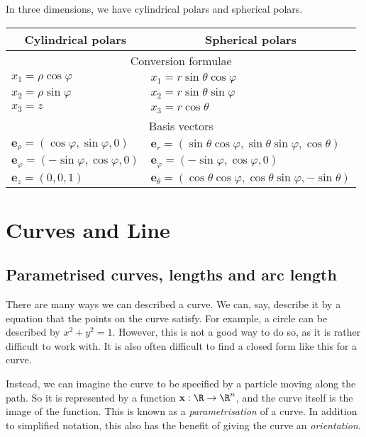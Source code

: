 \documentclass[a4paper]{article}
\begin{document}
In three dimensions, we have cylindrical polars and spherical polars.
\begin{center}
  \begin{tabularx}{\textwidth}{XX}
    \toprule
    \multicolumn{1}{c}{Cylindrical polars} & \multicolumn{1}{c}{Spherical polars}\\
    \midrule
    \multicolumn{2}{c}{Conversion formulae}\\
    \midrule
    $x_1 = \rho \cos \varphi$ & $x_1 = r\sin \theta\cos \varphi$\\
    $x_2 = \rho \sin \varphi$ & $x_2 = r\sin \theta \sin \varphi$\\
    $x_3 = z$ & $x_3 = r\cos\theta$\\
    \midrule
    \multicolumn{2}{c}{Basis vectors}\\
    \midrule
    $\mathbf{e}_\rho = (\cos\varphi, \sin \varphi, 0)$ & $\mathbf{e}_r = (\sin\theta\cos\varphi, \sin \theta\sin \varphi , \cos \theta)$\\
    $\mathbf{e}_\varphi = (-\sin \varphi, \cos \varphi, 0)$ & $\mathbf{e}_\varphi = (-\sin \varphi, \cos \varphi, 0)$\\
    $\mathbf{e}_z = (0, 0, 1)$ & $\mathbf{e}_\theta = (\cos \theta\cos \varphi, \cos\theta\sin\varphi, -\sin \theta)$\\
    \bottomrule
  \end{tabularx}
\end{center}

\section{Curves and Line}
\subsection{Parametrised curves, lengths and arc length}
There are many ways we can described a curve. We can, say, describe it by a equation that the points on the curve satisfy. For example, a circle can be described by $x^2 + y^2 = 1$. However, this is not a good way to do so, as it is rather difficult to work with. It is also often difficult to find a closed form like this for a curve.

Instead, we can imagine the curve to be specified by a particle moving along the path. So it is represented by a function $\mathbf{x}: \R \to \R^n$, and the curve itself is the image of the function. This is known as a \emph{parametrisation} of a curve. In addition to simplified notation, this also has the benefit of giving the curve an \emph{orientation}.
\end{document}

